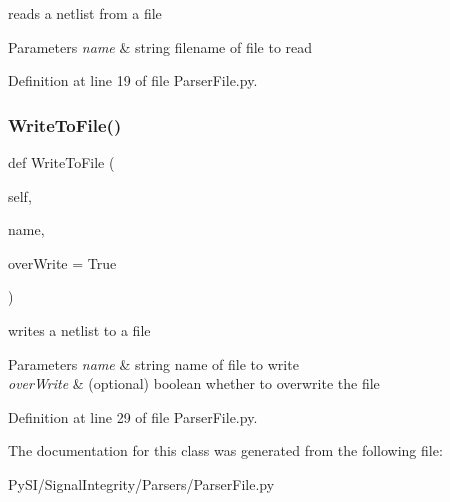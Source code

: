 reads a netlist from a file 


\begin{DoxyParams}{Parameters}
{\em name} & string filename of file to read \\
\hline
\end{DoxyParams}


Definition at line 19 of file Parser\+File.\+py.

\mbox{\label{classSignalIntegrity_1_1Parsers_1_1ParserFile_1_1ParserFile_a3ae128216b7f0540f8cd3793c4ed4903}} 
\subsubsection{\texorpdfstring{Write\+To\+File()}{WriteToFile()}}
{\footnotesize\ttfamily def Write\+To\+File (\begin{DoxyParamCaption}\item[{}]{self,  }\item[{}]{name,  }\item[{}]{over\+Write = {\ttfamily True} }\end{DoxyParamCaption})}



writes a netlist to a file 


\begin{DoxyParams}{Parameters}
{\em name} & string name of file to write \\
\hline
{\em over\+Write} & (optional) boolean whether to overwrite the file \\
\hline
\end{DoxyParams}


Definition at line 29 of file Parser\+File.\+py.



The documentation for this class was generated from the following file\+:\begin{DoxyCompactItemize}
\item 
Py\+S\+I/\+Signal\+Integrity/\+Parsers/Parser\+File.\+py\end{DoxyCompactItemize}
